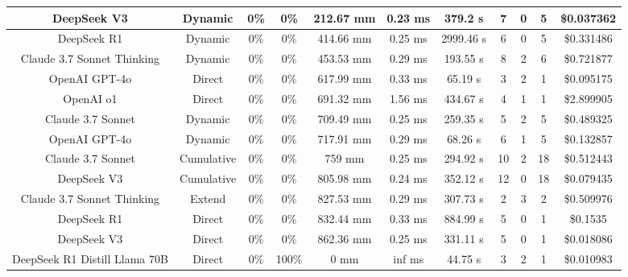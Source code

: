 \begin{landscape}
\begin{table}[H]
\begin{center}
\begin{tabular}{|c|c|c|c|c|c|c|c|c|c|c|}
    \hline
    DeepSeek V3 & Dynamic & 0\% & 0\% & 212.67 mm & 0.23 ms & 379.2 s & 7 & 0 & 5 & \$0.037362 \\
    \hline
    DeepSeek R1 & Dynamic & 0\% & 0\% & 414.66 mm & 0.25 ms & 2999.46 s & 6 & 0 & 5 & \$0.331486 \\
    \hline
    Claude 3.7 Sonnet Thinking & Dynamic & 0\% & 0\% & 453.53 mm & 0.29 ms & 193.55 s & 8 & 2 & 6 & \$0.721877 \\
    \hline
    OpenAI GPT-4o & Direct & 0\% & 0\% & 617.99 mm & 0.33 ms & 65.19 s & 3 & 2 & 1 & \$0.095175 \\
    \hline
    OpenAI o1 & Direct & 0\% & 0\% & 691.32 mm & 1.56 ms & 434.67 s & 4 & 1 & 1 & \$2.899905 \\
    \hline
    Claude 3.7 Sonnet & Dynamic & 0\% & 0\% & 709.49 mm & 0.25 ms & 259.35 s & 5 & 2 & 5 & \$0.489325 \\
    \hline
    OpenAI GPT-4o & Dynamic & 0\% & 0\% & 717.91 mm & 0.29 ms & 68.26 s & 6 & 1 & 5 & \$0.132857 \\
    \hline
    Claude 3.7 Sonnet & Cumulative & 0\% & 0\% & 759 mm & 0.25 ms & 294.92 s & 10 & 2 & 18 & \$0.512443 \\
    \hline
    DeepSeek V3 & Cumulative & 0\% & 0\% & 805.98 mm & 0.24 ms & 352.12 s & 12 & 0 & 18 & \$0.079435 \\
    \hline
    Claude 3.7 Sonnet Thinking & Extend & 0\% & 0\% & 827.53 mm & 0.29 ms & 307.73 s & 2 & 3 & 2 & \$0.509976 \\
    \hline
    DeepSeek R1 & Direct & 0\% & 0\% & 832.44 mm & 0.33 ms & 884.99 s & 5 & 0 & 1 & \$0.1535 \\
    \hline
    DeepSeek V3 & Direct & 0\% & 0\% & 862.36 mm & 0.25 ms & 331.11 s & 5 & 0 & 1 & \$0.018086 \\
    \hline
    DeepSeek R1 Distill Llama 70B & Direct & 0\% & 100\% & 0 mm & inf ms & 44.75 s & 3 & 2 & 1 & \$0.010983 \\
    \hline
\end{tabular}
\label{Results-Position-1-5}
\end{center}
\end{table}


\end{landscape}
